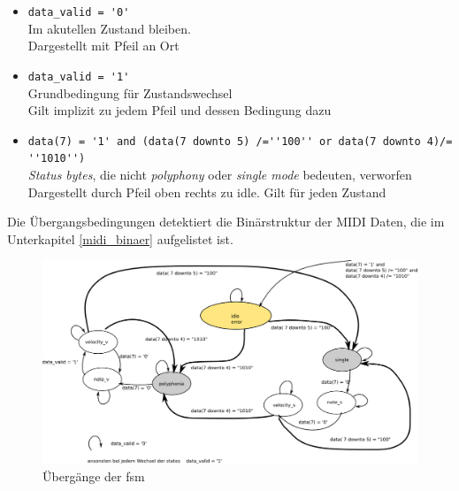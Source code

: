 \begin{itemize}
	\item \lstinline|data_valid = '0'|\\
        Im akutellen Zustand bleiben.\\
        Dargestellt mit Pfeil an Ort
	\item \lstinline|data_valid = '1'|\\
        Grundbedingung für Zustandswechsel\\
        Gilt implizit zu jedem Pfeil und dessen Bedingung dazu
	\item \lstinline|data(7) = '1' and (data(7 downto 5) /=''100'' or data(7 downto 4)/= ''1010'')| \\
        \textit{Status bytes}, die nicht \textit{polyphony} oder \textit{single mode} bedeuten, verworfen\\
        Dargestellt durch Pfeil oben rechts zu idle. Gilt für jeden Zustand
\end{itemize}
\bigskip

Die Übergangsbedingungen detektiert die Binärstruktur der MIDI Daten, die im Unterkapitel \ref{midi_binaer} aufgelistet ist.


\begin{figure}[H]
	\includegraphics[width=1\textwidth]{images/midi_control/fsm_detailliert.png}
	\caption{Übergänge der fsm}
	\label{fig.midi_fsm_detail}
\end{figure}

